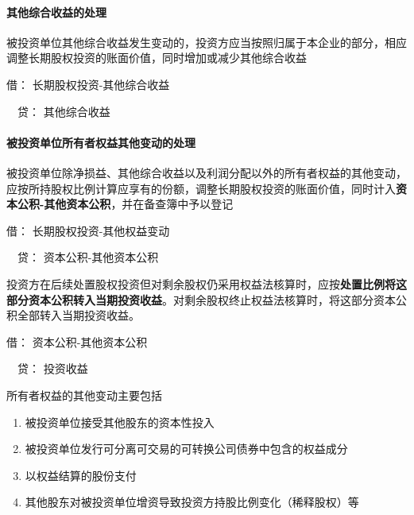 \documentclass[UTF8,12pt]{ctexart}
\newenvironment{Dr}{\noindent 借：}{\par}
\newenvironment{Cr}{\noindent \ \ 贷：}{\par}
\numberwithin{equation}{section} %
\numberwithin{figure}{section}
\numberwithin{table}{section}
\begin{document}
	
	
	\paragraph{其他综合收益的处理}
	被投资单位其他综合收益发生变动的，投资方应当按照归属于本企业的部分，相应调整长期股权投资的账面价值，同时增加或减少其他综合收益
	
	\begin{Dr}
		长期股权投资-其他综合收益
	\end{Dr}
	\begin{Cr}
		其他综合收益
	\end{Cr}
	
	\paragraph{被投资单位所有者权益其他变动的处理}
	被投资单位除净损益、其他综合收益以及利润分配以外的所有者权益的其他变动，应按所持股权比例计算应享有的份额，调整长期股权投资的账面价值，同时计入\textbf{资本公积-其他资本公积}，并在备查簿中予以登记
	
	\begin{Dr}
		长期股权投资-其他权益变动
	\end{Dr}
	\begin{Cr}
		资本公积-其他资本公积
	\end{Cr}
	
	投资方在后续处置股权投资但对剩余股权仍采用权益法核算时，应按\textbf{处置比例将这部分资本公积转入当期投资收益}。对剩余股权终止权益法核算时，将这部分资本公积全部转入当期投资收益。
	
	\begin{Dr}
		资本公积-其他资本公积
	\end{Dr}
	\begin{Cr}
		投资收益
	\end{Cr}
	
	所有者权益的其他变动主要包括
	\begin{enumerate}
		\item 被投资单位接受其他股东的资本性投入
		
		\item 被投资单位发行可分离可交易的可转换公司债券中包含的权益成分
		
		\item 以权益结算的股份支付
		
		\item 其他股东对被投资单位增资导致投资方持股比例变化（稀释股权）等
	\end{enumerate}
	
\end{document}
